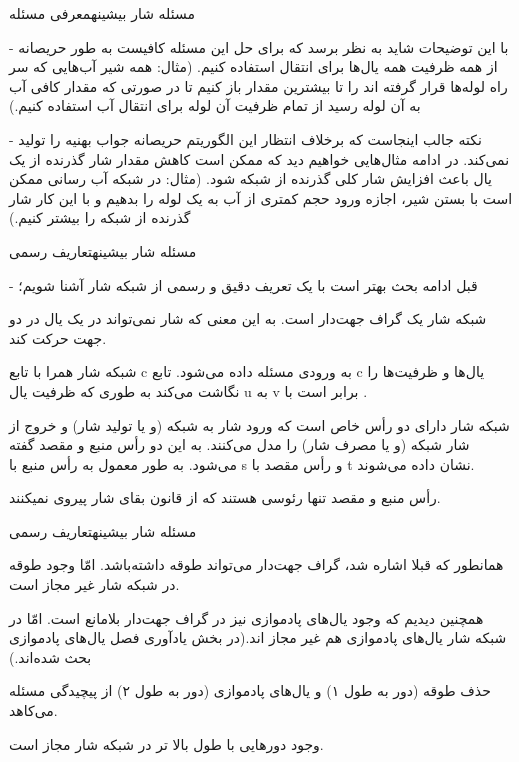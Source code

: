 \begin{itemframe}{مسئله شار بیشینه}{معرفی مسئله}

	\item[-]
با این توضیحات شاید به نظر برسد که برای حل این مسئله کافیست به طور حریصانه از همه ظرفیت همه یال‌ها برای انتقال استفاده کنیم. (مثال: همه شیر آب‌هایی که سر راه لوله‌ها قرار گرفته اند را تا بیشترین مقدار باز کنیم تا در صورتی که مقدار کافی آب به آن لوله رسید از تمام ظرفیت آن لوله برای انتقال آب استفاده کنیم.)
	\item[-]
نکته جالب اینجاست که برخلاف انتظار این الگوریتم حریصانه جواب بهنیه را تولید نمی‌کند. در ادامه مثال‌هایی خواهیم دید که ممکن است کاهش مقدار شار گذرنده از یک یال باعث افزایش شار کلی گذرنده از شبکه شود. (مثال: در شبکه آب رسانی ممکن است با بستن شیر، اجازه ورود حجم کمتری از آب به یک لوله را بدهیم و با این کار شار گذرنده از شبکه را بیشتر کنیم.)
\end{itemframe}

\begin{itemframe}{مسئله شار بیشینه}{تعاریف رسمی}
\item[-]
قبل ادامه بحث بهتر است با یک تعریف دقیق و رسمی از شبکه شار آشنا شویم؛
\item
شبکه شار یک گراف جهت‌دار است. به این معنی که شار نمی‌تواند در یک یال در دو جهت حرکت کند.

شبکه شار همرا با تابع c به ورودی مسئله داده می‌شود. تابع c یال‌ها و ظرفیت‌‌ها را نگاشت می‌کند به طوری که ظرفیت یال u به v برابر است با
 .
\item
شبکه شار دارای دو رأس خاص است که ورود شار به شبکه (و یا تولید شار) و خروج از شار شبکه (و یا مصرف شار) را مدل می‌کنند. به این دو رأس منبع
و مقصد
گفته می‌شود. به طور معمول به رأس منبع با s و رأس مقصد با t نشان داده می‌شوند.
\item
رأس منبع و مقصد تنها رئوسی هستند که از قانون بقای شار پیروی نمیکنند.
\end{itemframe}

\begin{itemframe}{مسئله شار بیشینه}{تعاریف رسمی}
\item
همانطور که قبلا اشاره شد، گراف جهت‌دار می‌تواند طوقه داشته‌باشد. امّا وجود طوقه در شبکه شار غیر مجاز است.
\item
همچنین دیدیم که وجود یال‌های پادموازی نیز در گراف جهت‌دار بلامانع است. امّا در شبکه شار یال‌های پادموازی هم غیر مجاز اند.(در بخش يادآوری فصل یال‌های پادموازی بحث شده‌اند.)
\item
حذف طوقه (دور به طول ۱) و یال‌های پادموازی (دور به طول ۲) از پیچیدگی مسئله می‌کاهد.
\item
وجود دورهایی با طول بالا تر در شبکه شار مجاز است.
\end{itemframe}

